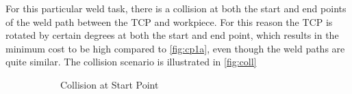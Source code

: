For this particular weld task, there is a collision at both the start and end points of the weld path between the TCP and workpiece. For this reason the TCP is rotated by certain degrees at both the start and end point, which results in the minimum cost to be high compared to \ref{fig:cp1a}, even though the weld paths are quite similar. The collision scenario is illustrated in \ref{fig:coll}
\begin{figure}[!htbp] %
	\centering
	\begin{subfigure}[b]{0.4\textwidth}
		\caption{Collision at Start Point}  
		\label{fig:colls}
	\end{subfigure}
	\begin{subfigure}[b]{0.4\textwidth}

\end{subfigure}
\end{figure}
